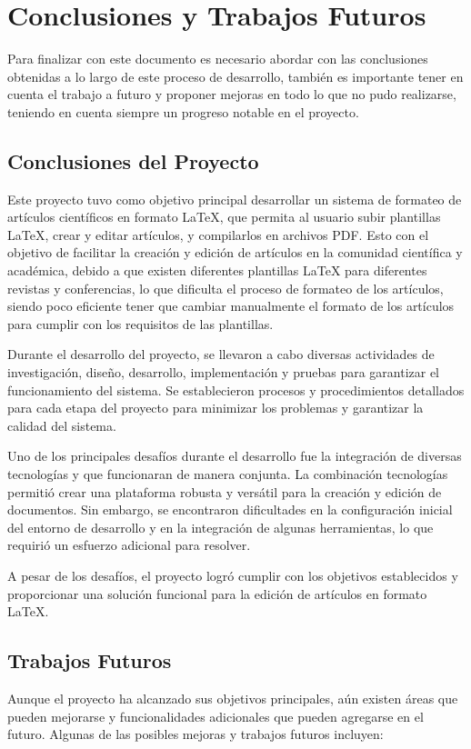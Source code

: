 \section{Conclusiones y Trabajos Futuros}
Para finalizar con este documento es necesario abordar con las conclusiones obtenidas a lo largo de este proceso de desarrollo, también es importante tener en cuenta el trabajo a futuro y proponer mejoras en todo lo que no pudo realizarse, teniendo en cuenta siempre un progreso notable en el proyecto. 

\subsection{Conclusiones del Proyecto}
Este proyecto tuvo como objetivo principal desarrollar un sistema de formateo de artículos científicos en formato LaTeX, que permita al usuario subir plantillas LaTeX, crear y editar artículos, y compilarlos en archivos PDF. Esto con el objetivo de facilitar la creación y edición de artículos en la comunidad científica y académica, debido a que existen diferentes plantillas LaTeX para diferentes revistas y conferencias, lo que dificulta el proceso de formateo de los artículos, siendo poco eficiente tener que cambiar manualmente el formato de los artículos para cumplir con los requisitos de las plantillas.

Durante el desarrollo del proyecto, se llevaron a cabo diversas actividades de investigación, diseño, desarrollo, implementación y pruebas para garantizar el funcionamiento del sistema. Se establecieron procesos y procedimientos detallados para cada etapa del proyecto para minimizar los problemas y garantizar la calidad del sistema. 

Uno de los principales desafíos durante el desarrollo fue la integración de diversas tecnologías y que funcionaran de manera conjunta. La combinación tecnologías permitió crear una plataforma robusta y versátil para la creación y edición de documentos. Sin embargo, se encontraron dificultades en la configuración inicial del entorno de desarrollo y en la integración de algunas herramientas, lo que requirió un esfuerzo adicional para resolver.

A pesar de los desafíos, el proyecto logró cumplir con los objetivos establecidos y proporcionar una solución funcional para la edición de artículos en formato LaTeX.

\subsection{Trabajos Futuros}
Aunque el proyecto ha alcanzado sus objetivos principales, aún existen áreas que pueden mejorarse y funcionalidades adicionales que pueden agregarse en el futuro. Algunas de las posibles mejoras y trabajos futuros incluyen:

